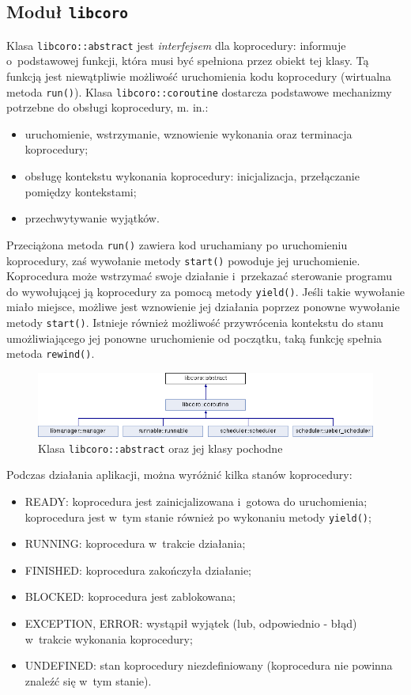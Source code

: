 \documentclass[11pt,makeidx]{mwart}
\newcommand{\code}{\texttt}
\newcommand{\dcolon}{::}
\newcommand{\procbr}{()}
\begin{document}
\subsection{Moduł \code{libcoro}}
\label{sec:coroutine}
%
\indent
	Klasa \code{libcoro::abstract} jest \emph{interfejsem} dla koprocedury: informuje o~podstawowej funkcji, która musi być spełniona
	przez obiekt tej klasy. Tą funkcją jest niewątpliwie możliwość uruchomienia kodu koprocedury (wirtualna metoda \code{run()}).
	Klasa \code{libcoro::coroutine} dostarcza podstawowe mechanizmy potrzebne do obsługi koprocedury, m. in.:
	\begin{itemize}
		\item uruchomienie, wstrzymanie, wznowienie wykonania oraz terminacja koprocedury;
		\item obsługę kontekstu wykonania koprocedury: inicjalizacja, przełączanie pomiędzy kontekstami;
		\item przechwytywanie wyjątków.
	\end{itemize}
	Przeciążona metoda \code{run()} zawiera kod uruchamiany po uruchomieniu koprocedury,
	zaś wywołanie metody \code{start()} powoduje jej uruchomienie.
	Koprocedura może wstrzymać swoje działanie i~przekazać sterowanie programu do wywołującej ją koprocedury za pomocą metody \code{yield()}.
	Jeśli takie wywołanie miało miejsce, możliwe jest wznowienie jej działania poprzez ponowne wywołanie metody \code{start()}.
	Istnieje również możliwość przywrócenia kontekstu do stanu umożliwiającego jej ponowne uruchomienie od początku, taką funkcję spełnia
	metoda \code{rewind\procbr}.
	\begin{figure}[h!]
		\centering
		\includegraphics[scale=.5]{classlibcoroabstract.png}
		\caption{Klasa \code{libcoro\dcolon abstract} oraz jej klasy pochodne}
	\end{figure}
	Podczas działania aplikacji, można wyróżnić kilka stanów koprocedury:
	\begin{itemize}
		\item READY: koprocedura jest zainicjalizowana i~gotowa do uruchomienia; koprocedura jest w~tym stanie również po wykonaniu metody
			\code{yield\procbr};
		\item RUNNING: koprocedura w~trakcie działania;
		\item FINISHED: koprocedura zakończyła działanie;
		\item BLOCKED: koprocedura jest zablokowana;
		\item EXCEPTION, ERROR: wystąpił wyjątek (lub, odpowiednio - błąd) w~trakcie wykonania koprocedury;
		\item UNDEFINED: stan koprocedury niezdefiniowany (koprocedura nie powinna znaleźć się w~tym stanie).
	\end{itemize}
\end{document}
